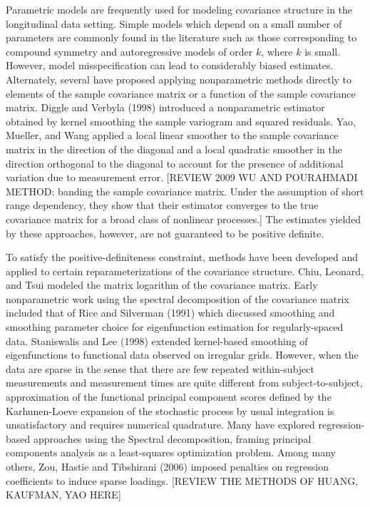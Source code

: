 \documentclass[12pt]{article}
\newcommand*\needsparaphrased{\color{red}}
\theoremstyle{definition}
\begin{document}
Parametric models are frequently used for modeling covariance structure in the longitudinal data setting. Simple models which depend on a small number of parameters  are commonly found in the literature such as those corresponding to compound symmetry and autoregressive models of order $k$, where $k$ is small. However, model misspecification can lead to considerably biased estimates. Alternately, several have proposed applying nonparametric methods directly to elements of the sample covariance matrix or a function of the sample covariance matrix. Diggle and Verbyla (1998) introduced a nonparametric estimator obtained by kernel smoothing the sample variogram and squared residuals.  Yao, Mueller, and Wang applied a local linear smoother to the sample covariance matrix in the direction of the diagonal and a local quadratic smoother in the direction orthogonal to the diagonal to account for the presence of additional variation due to measurement error.  {\needsparaphrased[REVIEW 2009 WU AND POURAHMADI  METHOD: banding the sample covariance matrix. Under the assumption of short range dependency, they show that their estimator converges to the true covariance matrix for a broad class of nonlinear processes.]} The estimates yielded by these approaches, however, are not guaranteed to be positive definite. 

To satisfy the positive-definiteness constraint, methods have been developed and applied to certain reparameterizations of the covariance structure. Chiu, Leonard, and Tsui modeled the matrix logarithm of the covariance matrix. Early nonparametric work using the spectral decomposition of the covariance matrix included that of Rice and Silverman (1991) which discussed smoothing and smoothing parameter choice for eigenfunction estimation for regularly-spaced data. Staniswalis and Lee (1998) extended kernel-based smoothing of eigenfunctions to functional data observed on irregular grids. However, when the data are sparse in the sense that there are few repeated within-subject measurements and measurement times are quite different from subject-to-subject, approximation of the functional principal component scores defined by the Karhunen-Loeve expansion of the stochastic process by usual integration is unsatisfactory and requires numerical quadrature. Many have explored regression-based approaches using the Spectral decomposition, framing principal components analysis as a least-squares optimization problem. Among many others, Zou, Hastie and Tibshirani (2006) imposed penalties on regression coefficients to induce sparse loadings. {\needsparaphrased[REVIEW THE METHODS OF HUANG, KAUFMAN, YAO HERE]}
\end{document}
